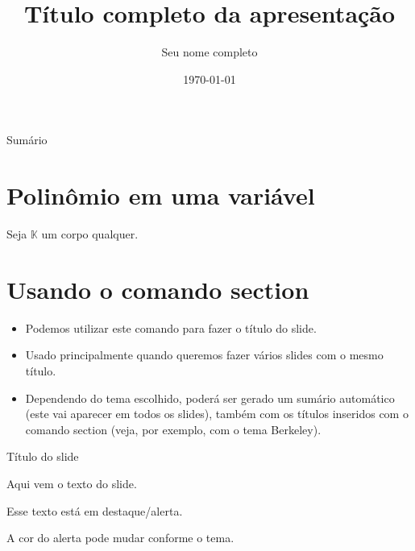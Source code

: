 \documentclass[aspectratio=169]{beamer}
\title[Título curto]{Título completo da apresentação}
\author[Nome abreviado]{Seu nome completo}
\institute[UTFPR]{Universidade Tecnológica Federal do Paraná - UTFPR \\ Campus Curitiba}
\date{\today}
\begin{document}

\begin{frame}
    \titlepage
\end{frame}

\begin{frame}{Sumário}
    \tableofcontents %
\end{frame}


\section{Polinômio em uma variável}
\begin{frame}{\insertsection}
    \begin{definition}
    Seja $\mathbb{K}$ um corpo qualquer. 
    \end{definition}
\end{frame}

\section{Usando o comando section}
\begin{frame}{\insertsection}
    \begin{itemize}
        \item Podemos utilizar este comando para fazer o título do slide.
        \item Usado principalmente quando queremos fazer vários slides com o mesmo título.
        \item Dependendo do tema escolhido, poderá ser gerado um sumário automático (este vai aparecer em todos os slides), também com os títulos inseridos com o comando section (veja, por exemplo, com o tema Berkeley).
    \end{itemize}
\end{frame}

\begin{frame}{Título do slide} 

    Aqui vem o texto do slide.

    \alert{Esse texto está em destaque/alerta.} 
    
    A cor do alerta pode mudar conforme o tema. 

\end{frame}
\end{document}
